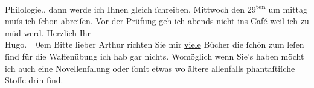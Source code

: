 \begin{ledgroupsized}[t]{13cm}
{{{                  Philologie.}}}\label{K_L00808-2h}, dann werde {\pb}ich Ihnen gleich ſchreiben. Mittwoch den 29\textsuperscript{ten} um mittag muſs ich ſchon abreiſen.\pend
           \pstart
           Vor der Prüfung geh ich abends nicht ins Café weil ich zu müd werd.\pend
           \pstart
           Herzlich Ihr{\\[\baselineskip]}\spacefill\mbox{Hugo.}\pend
           \leftskip=0em{}\pstart
           \noindent{}Bitte lieber Arthur richten Sie {\pb}mir \uline{viele} Bücher die ſchön zum leſen ſind für
                  die Waffenübung ich hab gar nichts. Womöglich wenn Sie’s haben möcht ich auch eine
                     Novellenſa{\geminationm}lung oder ſonſt etwas wo ältere
                  allenfalls phantaſtiſche Stoffe drin ſind.\pend
           
         
         \endnumbering{}\end{ledgroupsized}  \newcommand{\dateiname}{L00808}\newcommand{\titel}{Hugo von Hofmannsthal an Arthur Schnitzler, [21. 6. 1898]}\newcommand{\editorInnen}{Martin Anton Müller und Gerd-Hermann Susen}
      